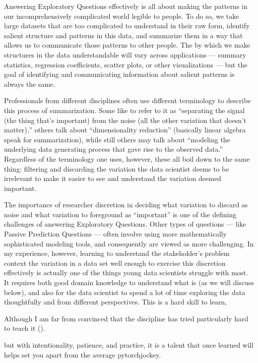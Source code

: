 \documentclass[letterpaper,10pt,english]{jupyterBook}
\begin{document}
\sphinxAtStartPar
Answering Exploratory Questions effectively is all about making the patterns in our incomprehensively complicated world legible to people. To do so, we take large datasets that are too complicated to understand in their raw form, identify salient structure and patterns in this data, and summarize them in a way that allows us to communicate those patterns to other people. The  by which we make structures in the data understandable will vary across applications — summary statistics, regression coefficients, scatter plots, or other visualizations — but the goal of identifying and communicating information about salient patterns is always the same.

\sphinxAtStartPar
Professionals from different disciplines often use different terminology to describe this process of summarization. Some like to refer to it as “separating the signal (the thing that’s important) from the noise (all the other variation that doesn’t matter),” others talk about “dimensionality reduction” (basically linear algebra speak for summarization), while still others may talk about “modeling the underlying data generating process that gave rise to the observed data.” Regardless of the terminology one uses, however, these all boil down to the same thing: filtering and discarding the variation the data scientist deems to be irrelevant to make it easier to see and understand the variation deemed important.

\sphinxAtStartPar
The importance of researcher discretion in deciding what variation to discard as noise and what variation to foreground as “important” is one of the defining challenges of answering Exploratory Questions. Other types of questions — like Passive Prediction Questions — often involve using more mathematically sophisticated modeling tools, and consequently are viewed as more challenging. In my experience, however, learning to understand the stakeholder’s problem context  the variation in a data set well enough to exercise this discretion effectively is actually one of the things young data scientists struggle with most. It requires both good domain knowledge to understand what is  (as we will discuss below), and also for the data scientist to spend a lot of time exploring the data thoughtfully and from different perspectives. This is a hard skill to learn,%
\begin{footnote}[1]\sphinxAtStartFootnote
Although I am far from convinced that the discipline has tried particularly hard to teach it ({\hyperref[\detokenize{30_questions/17_exploratory_internal_understandable:07_eda.ipynb}]{}}).
%
\end{footnote} but with intentionality, patience, and practice, it is a talent that once learned will helps set you apart from the average pytorch\sphinxhyphen{}jockey.
\end{document}

